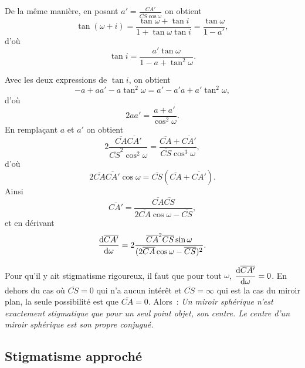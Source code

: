 De la même manière, en posant \(a' = \frac{\overline{CA'}}{\overline{CS} \cos \omega}\) on obtient
\begin{equation}
  \tan(\omega+i) = \frac{\tan \omega +\tan i}{1+ \tan\omega \tan i} =\frac{\tan \omega}{1-a'},
\end{equation}
d'où
\begin{equation}
  \tan i = \frac{a' \tan \omega}{1-a+\tan^2 \omega}.
\end{equation}

Avec les deux expressions de \(\tan i\), on obtient
\begin{equation}
  -a +aa' -a\tan^2\omega = a'-a'a+a'\tan^2\omega,
\end{equation}
d'où
\begin{equation}
  2aa' = \frac{a+a'}{\cos^2\omega}.
\end{equation}
En remplaçant \(a\) et \(a'\) on obtient
\begin{equation}
  2 \frac{\overline{CA}\overline{CA'}}{\overline{CS}^2\cos^2\omega} = \frac{\overline{CA} + \overline{CA'}}{\overline{CS} \cos^3\omega},
\end{equation}
d'où
\begin{equation}
  \label{eq:stigrigoureux}
  2 \overline{CA} \overline{CA'} \cos\omega = \overline{CS}(\overline{CA}+ \overline{CA'}).
\end{equation}
Ainsi
\begin{equation}
  \overline{CA'} = \frac{\overline{CA} \overline{CS}}{2 \overline{CA} \cos \omega - \overline{CS}},
\end{equation}
et en dérivant
\begin{equation}
  \dfrac{\mathrm{d} \overline{CA'}}{\mathrm{d} \omega} = 2 \frac{\overline{CA}^2 \overline{CS} \sin\omega}{(2 \overline{CA} \cos \omega - \overline{CS})^2}.
\end{equation}

Pour qu'il y ait stigmatisme rigoureux, il faut que pour tout \(\omega\), \(\dfrac{\mathrm{d} \overline{CA'}}{\mathrm{d} \omega} = 0\). En dehors du cas où \(\overline{CS}=0\) qui n'a aucun intérêt et \(\overline{CS}=\infty\) qui est la cas du miroir plan, la seule possibilité est que \(\overline{CA}=0\). Alors~:
\emph{Un miroir sphérique n'est exactement stigmatique que  pour un seul point objet, son centre. Le centre d'un miroir sphérique est son propre conjugué.}

\subsection{Stigmatisme approché}
\label{chap7-subsec:stigmatismeapproche}

